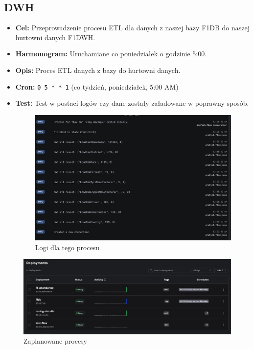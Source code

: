 \documentclass[12pt]{article}
\begin{document}
\subsection{DWH}
\begin{itemize}
    \item \textbf{Cel:} Przeprowadzenie procesu ETL dla danych z naszej bazy F1DB do naszej hurtowni danych F1DWH.
    \item \textbf{Harmonogram:} Uruchamiane co poniedziałek o godzinie 5:00.
    \item \textbf{Opis:} Proces ETL danych z bazy do hurtowni danych.
    \item \textbf{Cron:} \texttt{0 5 * * 1} (co tydzień, poniedziałek, 5:00 AM)
    \item \textbf{Test:}
    Test w postaci logów czy dane zostały załadowane w poprawny sposób.
    \begin{figure}[H]
    \centering
    \includegraphics[width=\textwidth]{test1.png}
    \caption{Logi dla tego procesu}
\end{figure}

\end{itemize}

\begin{figure}[H]
    \centering
    \includegraphics[width=\textwidth]{sc3.jpg}
    \caption{Zaplanowane procesy}
\end{figure}
\end{document}
